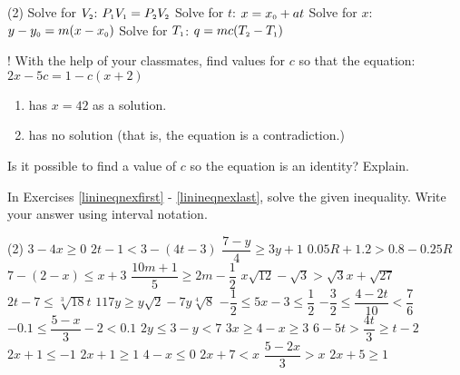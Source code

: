 \begin{tasks}[resume](2)
\task Solve for $V_{\text{\tiny $2$}}$:  $P_{\text{\tiny $1$}}V_{\text{\tiny $1$}} = P_{\text{\tiny $2$}}V_{\text{\tiny $2$}}$  \label{subex1}
\task Solve for $t$:  $x = x_{\text{\tiny $0$}} + at$ 
\task Solve for $x$:   $y-y_{\text{\tiny $0$}} = m(x -x_{\text{\tiny $0$}})$
\task Solve for $T_{\text{\tiny $1$}}$:  $q = mc(T_{\text{\tiny $2$}} -T_{\text{\tiny $1$}})$  \label {subex2} \label{literalexlast}

\task! With the help of your classmates, find values for $c$ so that the equation:  $2x - 5c = 1 - c(x+2)$

\begin{enumerate}[label=(\alph*)]

\item  has $x = 42$ as a solution.
\item  has no solution (that is, the equation is a contradiction.)

\end{enumerate}
Is it possible to find a value of $c$ so the equation is an identity?  Explain.

\end{tasks}

In Exercises \ref{linineqnexfirst} - \ref{linineqnexlast}, solve the given inequality.  Write your answer using interval notation.

\begin{tasks}[resume](2)
\task $3 - 4x \geq 0$\label{linineqnexfirst}
\task  $2t - 1 < 3 - (4t-3)$
\task  $\dfrac{7 -y}{4} \geq 3y + 1$ 
\task $0.05R + 1.2 > 0.8 - 0.25R$
\task $7 - (2-x) \leq x+3$
\task $\dfrac{10m+1}{5} \geq 2m - \dfrac{1}{2}$ 
\task $x \sqrt{12} - \sqrt{3} > \sqrt{3} x + \sqrt{27}$
\task  $2t - 7 \leq \sqrt[3]{18} t$
\task   $117y \geq y\sqrt{2} - 7y \sqrt[4]{8}$
\task $-\dfrac{1}{2} \leq 5x - 3 \leq \dfrac{1}{2}$
\task $-\dfrac{3}{2} \leq \dfrac{4 - 2t}{10} < \dfrac{7}{6}$
\task $-0.1 \leq \dfrac{5-x}{3} - 2 < 0.1$
\task  $2y \leq 3-y < 7$
\task  $3x \geq 4-x \geq 3$
\task  $6-5t > \dfrac{4t}{3} \geq t - 2$
\task   $2x+1 \leq -1$  $2x+1 \geq 1$ 
\task   $4-x \leq 0$  $2x+7 < x$
\task   $\dfrac{5-2x}{3} > x$  $2x + 5 \geq 1$ \label{linineqnexlast}
\end{tasks}

